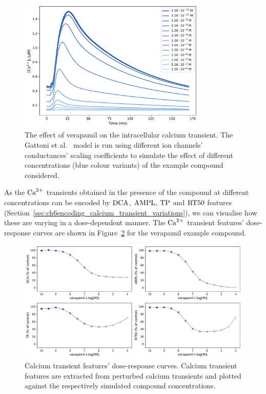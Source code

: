 \begin{figure}[ht!]
    \myfloatalign
    \includegraphics[width=0.8\textwidth]{figures/chapter06/verapamil_calcium_curve_drug.pdf}
    \caption{The effect of verapamil on the intracellular calcium transient. The Gattoni et al.~\cite{Gattoni:2017} model is run using different ion channels' conductances' scaling coefficients to simulate the effect of different concentrations (blue colour variants) of the example compound considered.}
    \label{fig:calciumverapamil}
\end{figure}

\vspace{0.2cm}
As the $\textrm{Ca}^{2+}$ transients obtained in the presence of the compound at different concentrations can be encoded by $\textrm{DCA}$, $\textrm{AMPL}$, $\textrm{TP}$ and $\textrm{RT50}$ features (Section~\ref{sec:ch6encoding_calcium_transient_variations}), we can visualise how these are varying in a dose-dependent manner. The $\textrm{Ca}^{2+}$ transient features' dose-response curves are shown in Figure~\ref{fig:cafeatsverapamilrespcurve} for the verapamil example compound.

\begin{figure}[ht!]
    \myfloatalign
    \includegraphics[width=\textwidth]{figures/chapter06/verapamil_dose_calcium_response_curve_drug.pdf}
    \caption{Calcium transient features' dose-response curves. Calcium transient features are extracted from perturbed calcium transients and plotted against the respectively simulated compound concentrations.}
    \label{fig:cafeatsverapamilrespcurve}
\end{figure}

